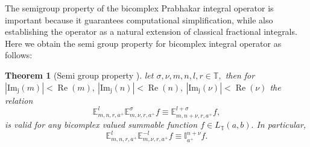 \documentclass[a4paper,12pt]{article}
\newtheorem{theorem}{Theorem}[section]
\theoremstyle{remark}
\begin{document}
\noindent The semigroup property of the bicomplex Prabhakar integral operator is important because it guarantees  computational simplification, while also establishing the operator as a natural extension of classical fractional integrals. Here we obtain the semi group property for  bicomplex integral operator as follows: 
\begin{theorem}[Semi group property ]
	let $\sigma ,\nu ,m,n,l,r\in \mathbb{T},$  then for $|\operatorname{Im_j}(m )|<\operatorname{Re}(m),~|\operatorname{Im_j}(n )|<\operatorname{Re}(n),~|\operatorname{Im_j}(\nu)|<\operatorname{Re}(\nu)$   the  relation  
	\begin{equation}\label{eq: comp1}
	\mathbb{E}^{l}_{m,n,r,a^+}\mathbb{E}^{\sigma}_{m,\nu ,r,a^+}	f\equiv\mathbb{E}^{l+\sigma}_{m,n+\nu  ,r,a^+}f,
	\end{equation}
	is valid for any bicomplex valued summable function $f \in  L_{\mathbb{T}}(a, b).$ In particular,
	\begin{equation}\label{eq: comp2}
	\mathbb{E}^{l}_{m,n,r,a^+}\mathbb{E}^{-l}_{m,\nu ,r,a^+}	f\equiv\mathbb{I}^{n+\nu }_{a^+}f.
	\end{equation}
\end{theorem}
\end{document}
